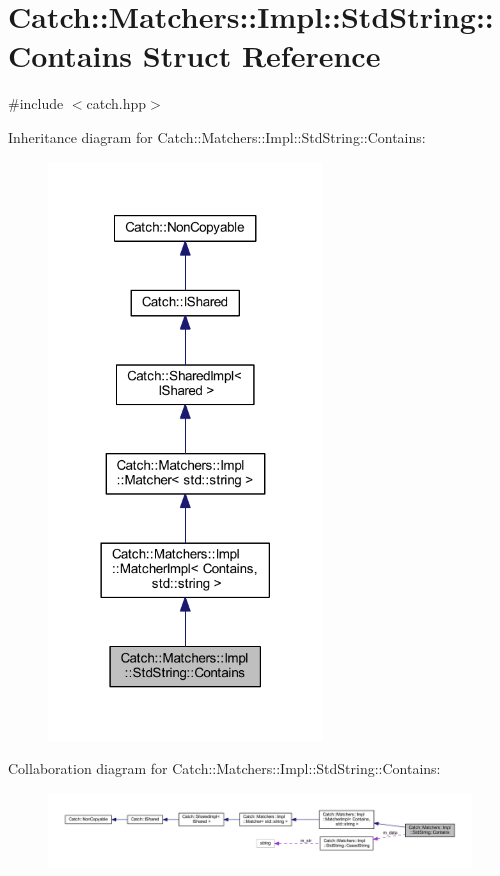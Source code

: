 \hypertarget{struct_catch_1_1_matchers_1_1_impl_1_1_std_string_1_1_contains}{}\section{Catch\+:\+:Matchers\+:\+:Impl\+:\+:Std\+String\+:\+:Contains Struct Reference}
\label{struct_catch_1_1_matchers_1_1_impl_1_1_std_string_1_1_contains}


{\ttfamily \#include $<$catch.\+hpp$>$}



Inheritance diagram for Catch\+:\+:Matchers\+:\+:Impl\+:\+:Std\+String\+:\+:Contains\+:\nopagebreak
\begin{figure}[H]
\begin{center}
\leavevmode
\includegraphics[width=206pt]{struct_catch_1_1_matchers_1_1_impl_1_1_std_string_1_1_contains__inherit__graph}
\end{center}
\end{figure}


Collaboration diagram for Catch\+:\+:Matchers\+:\+:Impl\+:\+:Std\+String\+:\+:Contains\+:\nopagebreak
\begin{figure}[H]
\begin{center}
\leavevmode
\includegraphics[width=350pt]{struct_catch_1_1_matchers_1_1_impl_1_1_std_string_1_1_contains__coll__graph}
\end{center}
\end{figure}

